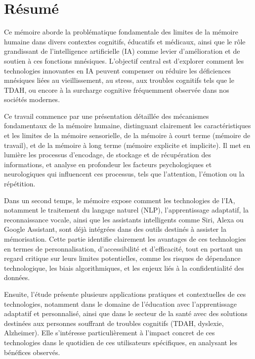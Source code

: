 \documentclass[11pt,a4paper]{report}
\begin{document}
\chapter*{Résumé}

Ce mémoire aborde la problématique fondamentale des limites de la mémoire humaine dans divers contextes cognitifs, éducatifs et médicaux, ainsi que le rôle grandissant de l'intelligence artificielle (IA) comme levier d’amélioration et de soutien à ces fonctions mnésiques. L’objectif central est d’explorer comment les technologies innovantes en IA peuvent compenser ou réduire les déficiences mnésiques liées au vieillissement, au stress, aux troubles cognitifs tels que le TDAH, ou encore à la surcharge cognitive fréquemment observée dans nos sociétés modernes.

Ce travail commence par une présentation détaillée des mécanismes fondamentaux de la mémoire humaine, distinguant clairement les caractéristiques et les limites de la mémoire sensorielle, de la mémoire à court terme (mémoire de travail), et de la mémoire à long terme (mémoire explicite et implicite). Il met en lumière les processus d’encodage, de stockage et de récupération des informations, et analyse en profondeur les facteurs psychologiques et neurologiques qui influencent ces processus, tels que l’attention, l’émotion ou la répétition.

Dans un second temps, le mémoire expose comment les technologies de l’IA, notamment le traitement du langage naturel (NLP), l'apprentissage adaptatif, la reconnaissance vocale, ainsi que les assistants intelligents comme Siri, Alexa ou Google Assistant, sont déjà intégrées dans des outils destinés à assister la mémorisation. Cette partie identifie clairement les avantages de ces technologies en termes de personnalisation, d'accessibilité et d'efficacité, tout en portant un regard critique sur leurs limites potentielles, comme les risques de dépendance technologique, les biais algorithmiques, et les enjeux liés à la confidentialité des données.

Ensuite, l’étude présente plusieurs applications pratiques et contextuelles de ces technologies, notamment dans le domaine de l’éducation avec l’apprentissage adaptatif et personnalisé, ainsi que dans le secteur de la santé avec des solutions destinées aux personnes souffrant de troubles cognitifs (TDAH, dyslexie, Alzheimer). Elle s’intéresse particulièrement à l’impact concret de ces technologies dans le quotidien de ces utilisateurs spécifiques, en analysant les bénéfices observés.
\end{document}
